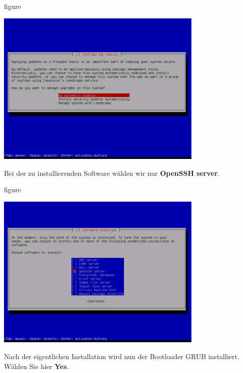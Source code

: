 \begin{nofloat}{figure}
\begin{center}
\includegraphics[width=0.75\textwidth]{screenshots/32_ubuntu_install.png}
\end{center}
\end{nofloat}
\newpage
Bei der zu installierenden Software wählen wir nur \textbf{OpenSSH server}.

\begin{nofloat}{figure}
\begin{center}
\includegraphics[width=0.75\textwidth]{screenshots/33_ubuntu_install.png}
\end{center}
\end{nofloat}

Nach der eigentlichen Installation wird nun der Bootloader GRUB installiert.
Wählen Sie hier \textbf{Yes}.

